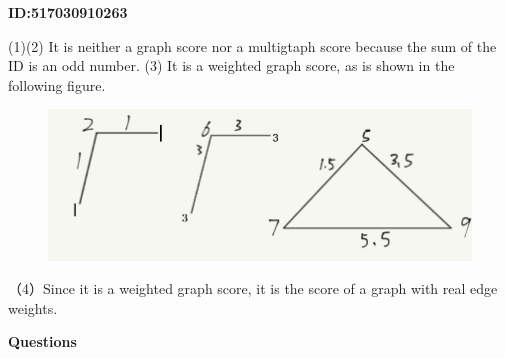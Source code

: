 \documentclass{article} %
\begin{document}
	\textbf{ID:517030910263}\par
	(1)(2) It is neither a graph score nor a multigtaph score because the sum of the ID is an odd number.
	(3) It is a weighted graph score, as is shown in the following figure.
	
	\begin{figure}[H]
		\centering
		\includegraphics[scale=0.6]{10263.png}
		\caption{}
		\label{fig:5}
	\end{figure}
	（4）Since it is a weighted graph score, it is the score of a graph with real edge weights.

	\textbf{Questions}\par
	
\end{document}
